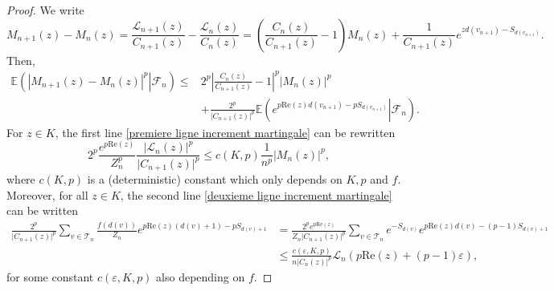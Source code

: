 \documentclass[11pt]{article}
\numberwithin{equation}{section}
\def\vp{\varepsilon}
\def \T{\mathcal{T}}
\def \cL{\mathcal{L}}
\def\E{\mathbb{E}}
\renewcommand{\Re}{\mathrm{Re}}
\begin{document}
\begin{proof}
	We write
	\[
	M_{n+1}(z) -
	M_n(z) = \frac{\cL_{n+1}(z)}{C_{n+1}(z)} - \frac{\cL_n(z)}{C_n(z)} = \left( \frac{C_n(z)}{C_{n+1}(z)} -1\right)M_n(z) + \frac{1}{C_{n+1}(z)} e^{zd(v_{n+1}) - S_{d(v_{n+1})}}.
	\]
	Then,
	\begin{align}
		\E\left( \left. \left\vert M_{n+1}(z)-M_n(z) \right\vert^p  \right\vert \mathcal{F}_n\right)\le &2^p\left\vert \frac{C_n(z)}{C_{n+1}(z)} -1\right\vert^p \vert M_n(z)\vert^p \label{premiere ligne increment martingale}\\
		&+\frac{2^p}{\vert C_{n+1}(z)\vert^p} \E\left(\left.   e^{p \Re(z) d(v_{n+1})-pS_{d(v_{n+1})}} \right\vert \mathcal{F}_n \right).\label{deuxieme ligne increment martingale}
	\end{align}
	For $z \in K$, the first line \eqref{premiere ligne increment martingale} can be rewritten
	\[
	2^p \frac{e^{p\Re(z)}}{Z_n^p} \frac{\vert \cL_n(z) \vert^p}{\vert C_{n+1}(z) \vert^p}  \le c(K,p) \frac{1}{n^p} \vert M_n(z)\vert^p,
	\]
	where $c(K,p)$ is a (deterministic) constant which only depends on $K,p$ and $f$. Moreover, for all $z \in K$, the second line \eqref{deuxieme ligne increment martingale} can be written
	\begin{align*}
		\frac{2^p}{\vert C_{n+1}(z)\vert^p} \sum_{v \in \T_n} \frac{f(d(v))}{Z_n} e^{p\Re(z)(d(v)+1)-p S_{d(v)+1}}&=\frac{2^p e^{p\Re(z)}}{Z_n\vert C_{n+1}(z)\vert^p} \sum_{v \in \T_n} e^{-S_{d(v)}} e^{p\Re(z)d(v) -(p-1) S_{d(v)+1}}\\
		&\le \frac{c(\vp, K, p)}{n\vert C_{n}(z)\vert^p} \cL_n(p\Re(z) + (p-1)\vp),
	\end{align*}
	for some constant $c(\vp, K, p)$ also depending on $f$.
	

\end{proof}
\end{document}
